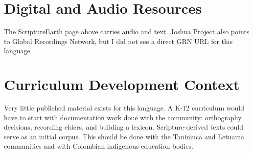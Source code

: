 \documentclass[12pt]{article}
\begin{document}
\section{Digital and Audio Resources}
The ScriptureEarth page above carries audio and text. Joshua Project also points to Global Recordings Network, but I did not see a direct GRN URL for this language.

\section{Curriculum Development Context}
Very little published material exists for this language. A K-12 curriculum would have to start with documentation work done with the community: orthography decisions, recording elders, and building a lexicon. Scripture-derived texts could serve as an initial corpus. This should be done with the Tanimuca and Letuama communities and with Colombian indigenous education bodies.
\end{document}
